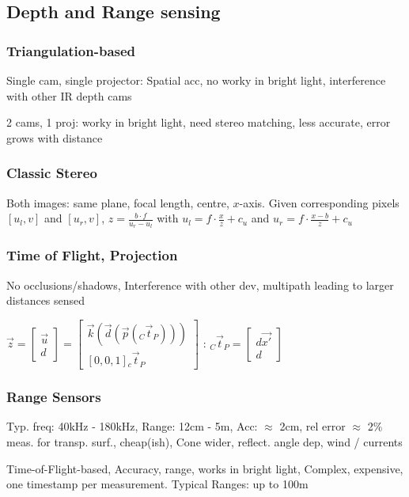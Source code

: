 \subsection{Depth and Range sensing}
\subsubsection{Triangulation-based}
 Single cam, single projector: {\color{ForestGreen}Spatial acc}, {\color{red} no worky in bright light, interference with other IR depth cams}

 2 cams, 1 proj: {\color{ForestGreen} worky in bright light}, {\color{red} need stereo matching, less accurate, error grows with distance}


\subsubsection{Classic Stereo}
Both images: same plane, focal length, centre, $x$-axis. Given corresponding pixels $[u_l, v]$ and $[u_r, v]$,
$z = \frac{b \cdot f}{u_r - u_l}$ with $u_l = f\cdot \frac{x}{z} + c_u$ and $u_r = f \cdot \frac{x - b}{z} + c_u$


\subsubsection{Time of Flight, Projection}
{\color{ForestGreen}No occlusions/shadows}, {\color{red}Interference with other dev, multipath leading to larger distances sensed}

 $\vec{z} = \begin{bmatrix}
        \vec{u} \\ d
    \end{bmatrix} =
    \begin{bmatrix}
        \vec{k}(\vec{d}(\vec{p}({_C}\vec{t}_P))) \\
        [0, 0, 1] {_c}\vec{t}_P
    \end{bmatrix}$
: ${_C}\vec{t}_P
    = \begin{bmatrix}
        d \vec{x'} \\d
    \end{bmatrix}$


\subsubsection{Range Sensors}
 Typ. freq: 40kHz - 180kHz, Range: 12cm - 5m, Acc: $\approx$ 2cm, rel error $\approx$ 2\%
{\color{ForestGreen} meas. for transp. surf., cheap(ish)}, {\color{red} Cone wider, reflect. angle dep, wind / currents}

 Time-of-Flight-based, {\color{ForestGreen}Accuracy, range, works in bright light}, {\color{red} Complex, expensive, one timestamp per measurement}.
Typical Ranges: up to 100m
